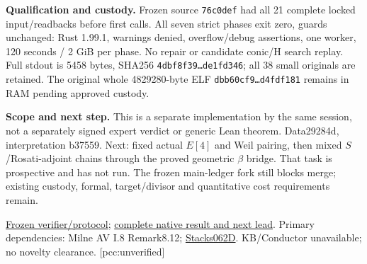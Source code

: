 \documentclass[10pt,a4paper]{article}
\begin{document}
\textbf{Qualification and custody.} Frozen source \texttt{76c0def}
had all 21 complete locked input/readbacks before first calls. All seven
strict phases exit zero, guards unchanged: Rust 1.99.1, warnings denied,
overflow/debug assertions, one worker, 120 seconds / 2 GiB per phase.
No repair or candidate conic/H search replay. Full stdout is 5458 bytes,
SHA256 \texttt{4dbf8f39\ldots{}de1fd346}; all 38 small originals are
retained. The original whole 4829280-byte ELF
\texttt{dbb60cf9\ldots{}d4fdf181} remains in RAM pending approved custody.

\textbf{Scope and next step.} This is a separate implementation by the
same session, not a separately signed expert verdict or generic Lean
theorem. Data29284d, interpretation b37559. Next: fixed actual $E[4]$
and Weil pairing, then mixed $S$/Rosati-adjoint chains through the proved
geometric $\beta$ bridge. That task is prospective and has not run.
The frozen main-ledger fork still blocks merge; existing custody,
formal, target/divisor and quantitative cost requirements remain.

\href{https://github.com/isogeny-labs/crypto/tree/76c0defa39d4c394bf6f2ee0d1409560cc836d20/research/chained_cm19_certificate_audit_20261123}{Frozen verifier/protocol};
\href{https://github.com/isogeny-labs/crypto/tree/6ac7338ac51d1339558281fdd45f0357987ffa09/research/chained_cm19_certificate_audit_20261123}{complete native result and next lead}.
Primary dependencies: Milne AV I.8 Remark8.12;
\href{https://stacks.math.columbia.edu/tag/062D}{Stacks062D}.
KB/Conductor unavailable; no novelty clearance. [pcc:unverified]
\end{document}
